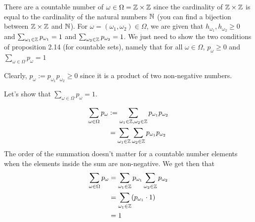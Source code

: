 
There are a countable number of $ \omega \in \Omega = \mathbb{Z} \times \mathbb{Z}$ since the cardinality of $ \mathbb{Z}
\times \mathbb{Z}$ is equal to the cardinality of the natural numbers $ \mathbb{N}$ (you can find a bijection 
between $ \mathbb{Z} \times \mathbb{Z} $ and $ \mathbb{N}$).  For $ \omega = (\omega_1, \omega_2 ) \in \Omega$,
we are given that $ h_{\omega_1}, h_{\omega_{2} } \geq 0 $ and $ \sum_{\omega_{1} \in \mathbb{Z} }
p_{\omega_1} = 1$ and $ \sum_{\omega_2 \in \mathbb{Z}} p_{\omega_2} = 1$. We just need to show the two
conditions of proposition 2.14 (for countable sets), namely that for all $\omega \in \Omega $, 
$ p_{\omega} \geq 0  $ and $ \sum_{\omega \in \Omega} p_{\omega} = 1  $

Clearly, $ p_{\omega}:= p_{\omega_1} p_{\omega_2} \geq 0  $ since it is a product of two
non-negative numbers.

Let's show that $ \sum_{\omega \in \Omega} p_{\omega} = 1$. 

\begin{align*}
    \sum_{\omega \in \Omega} p_{\omega} &:= \sum_{\omega_1 \in \mathbb{Z}, \omega_{2} \in \mathbb{Z} }
    p_{\omega_1}p_{\omega_2}\\
					&= \sum_{\omega_{1} \in \mathbb{Z}} \sum_{\omega_{2} \in \mathbb{Z}}
					p_{\omega_{1} } p_{\omega_{2} }  
\end{align*}
The order of the summation doesn't matter for a countable number elements when
the elements inside the sum are non-negative. 
We get then that 
\begin{align*}
    \sum_{\omega \in \Omega} p_{\omega} &= \sum_{\omega_1 \in \mathbb{Z}} p_{\omega_1} \sum_{\omega_{2} \in
    \mathbb{Z}} p_{\omega_{2} }\\
					&= \sum_{\omega_{1} \in \mathbb{Z} } (p_{\omega_1} \cdot 1 )\\
					&= 1
\end{align*}

